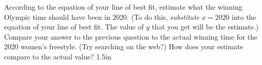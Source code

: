 \myProblems
{
    \small 
    According to the equation of your line of best fit, 
    estimate what the winning Olympic time should have been in 2020.
    (To do this, {\itshape substitute} $x=2020$ into the equation of your line of best fit. 
    The value of $y$ that you get will be the estimate.)
}
{
    \small
    Compare your answer to the previous question 
    to the actual winning time for the 2020 women's freestyle. (Try searching on the web?)
    How does your estimate compare to the actual value?
}
{1.5in}